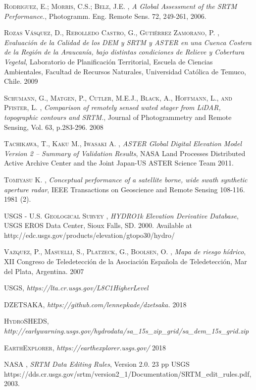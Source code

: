 \begin{thebibliography}{9}
 \textsc{Rodriguez, E.; Morris, C.S.; Belz, J.E.} , \textit{A Global Assessment of the SRTM Performance.},  Photogramm. Eng. Remote Sens. 72, 249-261, 2006.

 \textsc{Rozas Vásquez, D., Rebolledo Castro, G., Gutiérrez Zamorano, P.} , \textit{Evaluación de la Calidad de los DEM y SRTM y ASTER en una Cuenca Costera de la Región de la Araucanía, bajo distintas condiciones de Relieve y Cobertura Vegetal}, Laboratorio de Planificación Territorial, Escuela de Ciencias Ambientales, Facultad de Recursos Naturales, Universidad Católica de Temuco, Chile. 2009

 \textsc{Schumann, G., Matgen, P., Cutler, M.E.J., Black, A., Hoffmann, L., and Pfister, L.} , \textit{Comparison of remotely sensed wated stager from LiDAR, topographic contours and SRTM.}, Journal of Photogrammetry and Remote Sensing, Vol. 63, p.283-296. 2008

 \textsc{Tachikawa, T., Kaku M., Iwasaki A.} , \textit{ASTER Global Digital Elevation Model Version 2 – Summary of Validation Results},  NASA Land Processes Distributed Active Archive Center and the Joint Japan-US ASTER Science Team 2011.

 \textsc{Tomiyasu K.} , \textit{Conceptual performance of a satellite borne, wide swath synthetic aperture radar},  IEEE Transactions on Geoscience and Remote Sensing 108-116. 1981 (2). 

 \textsc{USGS - U.S. Geological Survey} , \textit{HYDRO1k Elevation Derivative Database}, USGS EROS Data Center, Sioux Falls, SD. 2000. Available at http://edc.usgs.gov/products/elevation/gtopo30/hydro/


 \textsc{Vazquez, P., Masuelli, S., Platzeck, G., Boolsen, O.} , \textit{Mapa de riesgo hídrico}, XII Congreso de Teledetección de la Asociación Española de Teledetección, Mar del Plata, Argentina. 2007

 \textsc{USGS}, \textit{https://lta.cr.usgs.gov/L8C1HigherLevel}

 \textsc{DZETSAKA}, \textit{https://github.com/lennepkade/dzetsaka.} 2018

 \textsc{HydroSHEDS}, \textit{http://earlywarning.usgs.gov/hydrodata/sa\_15s\_zip\_grid/sa\_dem\_15s\_grid.zip}

 \textsc{EarthExplorer}, \textit{https://earthexplorer.usgs.gov/} 2018

 \textsc{NASA} , \textit{SRTM Data Editing Rules}, Version 2.0. 23 pp USGS \\https://dds.cr.usgs.gov/srtm/version2\_1/Documentation/SRTM\_edit\_rules.pdf, 2003.


\end{thebibliography}

